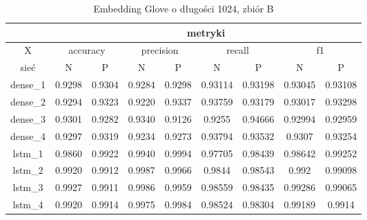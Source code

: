 \begin{table}[p] \label{tab:wyniki_glove_B} \centering
    \caption{Embedding Glove o długości 1024, zbiór B}
    \begin{tabular} {|c|c|c|c|c|c|c|c|c| }    \hline
                 & \multicolumn{8}{c|}{metryki}                                                                                                                                   \\ \hline
        X        & \multicolumn{2}{c|}{accuracy} & \multicolumn{2}{c|}{precision} & \multicolumn{2}{c|}{recall} & \multicolumn{2}{c|}{f1}                                         \\ \hline
        sieć     & N                             & P                              & N                           & P                       & N       & P       & N       & P       \\ \hline
        dense\_1 & 0.9298                        & 0.9304                         & 0.9284                      & 0.9298                  & 0.93114 & 0.93198 & 0.93045 & 0.93108 \\ \hline
        dense\_2 & 0.9294                        & 0.9323                         & 0.9220                      & 0.9337                  & 0.93759 & 0.93179 & 0.93017 & 0.93298 \\ \hline
        dense\_3 & 0.9301                        & 0.9282                         & 0.9340                      & 0.9126                  & 0.9255  & 0.94666 & 0.92994 & 0.92959 \\ \hline
        dense\_4 & 0.9297                        & 0.9319                         & 0.9234                      & 0.9273                  & 0.93794 & 0.93532 & 0.9307  & 0.93254 \\ \hline
        lstm\_1  & 0.9860                        & 0.9922                         & 0.9940                      & 0.9994                  & 0.97705 & 0.98439 & 0.98642 & 0.99252 \\ \hline
        lstm\_2  & 0.9920                        & 0.9912                         & 0.9987                      & 0.9966                  & 0.9844  & 0.98543 & 0.992   & 0.99098 \\ \hline
        lstm\_3  & 0.9927                        & 0.9911                         & 0.9986                      & 0.9959                  & 0.98559 & 0.98435 & 0.99286 & 0.99065 \\ \hline
        lstm\_4  & 0.9920                        & 0.9914                         & 0.9975                      & 0.9984                  & 0.98524 & 0.98304 & 0.99189 & 0.9914  \\ \hline

\end{tabular}
\end{table}
